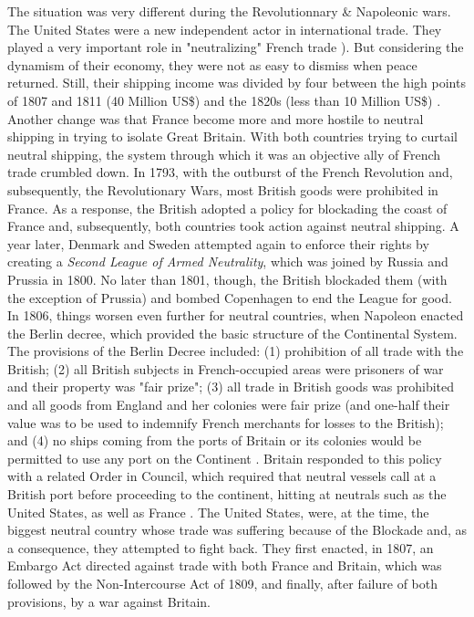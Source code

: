 \documentclass[12pt,a4paper,notitlepage,english]{article}
\begin{document}
  
The situation was very different during the Revolutionnary \& Napoleonic wars.
The United States were a new independent actor in international trade.
They played a very important role in "neutralizing" French trade \citep{Marzagalli2005,Marzagalli2015}).
But considering the dynamism of their economy, they were not as easy to dismiss when peace returned.
Still, their shipping income was divided by four between the high points of 1807 and 1811 (40 Million US\$) and the 1820s (less than 10 Million US\$) \citep[tables A-4 and B-2]{North1960}.
Another change was that France become more and more hostile to neutral shipping in trying to isolate Great Britain.
With both countries trying to curtail neutral shipping, the system through which it was an objective ally of French trade crumbled down.
In 1793, with the outburst of the French Revolution and, subsequently, the Revolutionary Wars, most British goods were prohibited in France.
As a response, the British adopted a policy for blockading the coast of France and, subsequently, both countries took action against neutral shipping.
A year later, Denmark and Sweden attempted again to enforce their rights by creating a \textit{Second League of Armed Neutrality}, which was joined by Russia and Prussia in 1800.
No later than 1801, though, the British blockaded them (with the exception of Prussia) and bombed Copenhagen to end the League for good.
In 1806, things worsen even further for neutral countries, when Napoleon enacted the Berlin decree, which provided the basic structure of the Continental System.
The provisions of the Berlin Decree included: (1) prohibition of all trade with the British; (2) all British subjects in French-occupied areas were prisoners of war and their property was "fair prize"; (3) all trade in British goods was prohibited and all goods from England and her colonies were fair prize (and one-half their value was to be used to indemnify French merchants for losses to the British); and (4) no ships coming from the ports of Britain or its colonies would be permitted to use any port on the Continent \citep{Davis2006}.
Britain responded to this policy with a related Order in Council, which required that neutral vessels call at a British port before proceeding to the continent, hitting at neutrals such as the United States, as well as France \citep{Davis2006}.
The United States, were, at the time, the biggest neutral country whose trade was suffering because of the Blockade and, as a consequence, they attempted to fight back.
They first enacted, in 1807, an Embargo Act directed against trade with both France and Britain, which was followed by the Non-Intercourse Act of 1809, and finally, after failure of both provisions, by a war against Britain.
\end{document}
